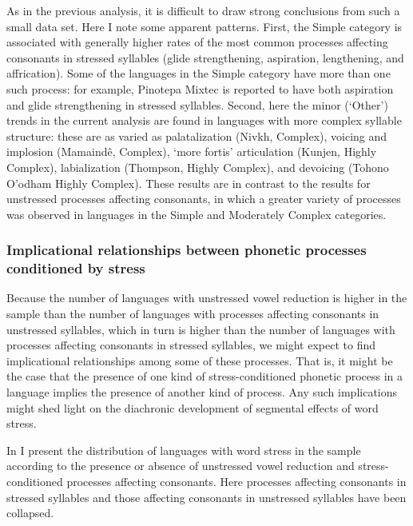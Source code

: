   As in the previous analysis, it is difficult to draw strong conclusions from such a small data set. Here I note some apparent patterns. First, the Simple category is associated with generally higher rates of the most common processes affecting consonants in stressed syllables (glide strengthening, aspiration, lengthening, and affrication). Some of the languages in the Simple category have more than one such process: for example, Pinotepa Mixtec is reported to have both aspiration and glide strengthening in stressed syllables. Second, here the minor (‘Other’) trends in the current analysis are found in languages with more complex syllable structure: these are as varied as palatalization (Nivkh, Complex), voicing and implosion (Mamaindê, Complex), ‘more fortis’ articulation (Kunjen, Highly Complex), labialization (Thompson, Highly Complex), and devoicing (Tohono O’odham Highly Complex). These results are in contrast to the results for unstressed processes affecting consonants, in which a greater variety of processes was observed in languages in the Simple and Moderately Complex categories.

\subsubsection{{Implicational} {relationships} {between} {phonetic} {processes} {conditioned} {by} {stress}}\label{sec:5.4.3.4}

  Because the number of languages with unstressed vowel reduction is higher in the sample than the number of languages with processes affecting consonants in unstressed syllables, which in turn is higher than the number of languages with processes affecting consonants in stressed syllables, we might expect to find implicational relationships among some of these processes. That is, it might be the case that the presence of one kind of stress-conditioned phonetic process in a language implies the presence of another kind of process. Any such implications might shed light on the diachronic development of segmental effects of word stress.

  In  I present the distribution of languages with word stress in the sample according to the presence or absence of unstressed vowel reduction and stress-conditioned processes affecting consonants. Here processes affecting consonants in stressed syllables and those affecting consonants in unstressed syllables have been collapsed.

